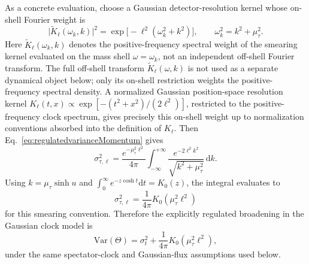 \documentclass[11pt, a4paper]{article}
\theoremstyle{definition}
\theoremstyle{plain}
\theoremstyle{remark}
\numberwithin{equation}{section}
\newcommand{\dd}{\mathrm{d}}
\begin{document}
        As a concrete evaluation, choose a Gaussian detector-resolution kernel whose on-shell Fourier weight is
        \begin{equation}
            \bigl|\widetilde K_\ell(\omega_k,k)\bigr|^2
            =
            \exp\!\big[-\ell^2(\omega_k^2+k^2)\big],
            \qquad
            \omega_k^2=k^2+\mu_\tau^2 .
            \label{eq:gaussianKernelWeight}
        \end{equation}
        Here $\widetilde K_\ell(\omega_k,k)$ denotes the positive-frequency spectral weight of the smearing kernel evaluated on the mass shell $\omega=\omega_k$, not an independent off-shell Fourier transform. The full off-shell transform $\widetilde K_\ell(\omega,k)$ is not used as a separate dynamical object below; only its on-shell restriction weights the positive-frequency spectral density. A normalized Gaussian position-space resolution kernel $K_\ell(t,x)\propto\exp[-(t^2+x^2)/(2\ell^2)]$, restricted to the positive-frequency clock spectrum, gives precisely this on-shell weight up to normalization conventions absorbed into the definition of $K_\ell$.
        Then Eq.~\eqref{eq:regulatedvarianceMomentum} gives
        \begin{equation}
            \sigma_{\tau,\ell}^{2}
            =
            \frac{e^{-\mu_\tau^2\ell^2}}{4\pi}
            \int_{-\infty}^{+\infty}
            \frac{e^{-2\ell^2 k^2}}{\sqrt{k^2+\mu_\tau^2}}\,\dd k .
            \label{eq:gaussianVarianceIntegral}
        \end{equation}
        Using $k=\mu_\tau\sinh u$ and
        $\int_0^\infty e^{-z\cosh t}\dd t=K_0(z)$, the integral evaluates to
        \begin{equation}
            \boxed{
            \sigma_{\tau,\ell}^{2}
            =
            \frac{1}{4\pi}
            K_0(\mu_\tau^2\ell^2)
            }
            \label{eq:gaussianVarianceClosed}
        \end{equation}
        for this smearing convention. Therefore the explicitly regulated broadening in the Gaussian clock model is
        \begin{equation}
            \mathrm{Var}(\Theta)
            =
            \sigma_t^2+\frac{1}{4\pi}K_0(\mu_\tau^2\ell^2),
            \label{eq:explicitBroadening}
        \end{equation}
        under the same spectator-clock and Gaussian-flux assumptions used below.
\end{document}
